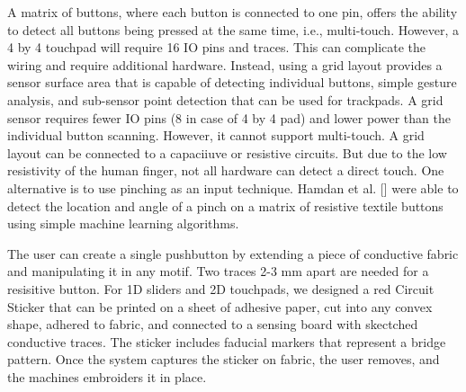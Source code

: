 \documentclass[header.tex]{subfiles}
\begin{document}

A matrix of buttons, where each button is connected to one pin, offers the ability to detect all buttons being pressed at the same time, i.e., multi-touch. However, a 4 by 4 touchpad will require 16 IO pins and traces. This can complicate the wiring and require additional hardware. Instead, using a grid layout provides a sensor surface area that is capable of detecting individual buttons, simple gesture analysis, and sub-sensor point detection that can be used for trackpads. A grid sensor requires fewer IO pins (8 in case of 4 by 4 pad) and lower power than the individual button scanning. However, it cannot support multi-touch. A grid layout can be connected to a capaciiuve or resistive circuits. But due to the low resistivity of the human finger, not all hardware can detect a direct touch. One alternative is to use pinching as an input technique. Hamdan et al. [] were able to detect the location and angle of a pinch on a matrix of resistive textile buttons using simple machine learning algorithms.


The user can create a single pushbutton by extending a piece of conductive fabric and manipulating it in any motif. Two traces 2-3 mm apart are needed for a resisitive button. For 1D sliders and 2D touchpads, we designed a red Circuit Sticker that can be printed on a sheet of adhesive paper, cut into any convex shape, adhered to fabric, and connected to a sensing board with skectched conductive traces. The sticker includes faducial markers that represent a bridge pattern. Once the system captures the sticker on fabric, the user removes, and the machines embroiders it in place.




\end{document}
